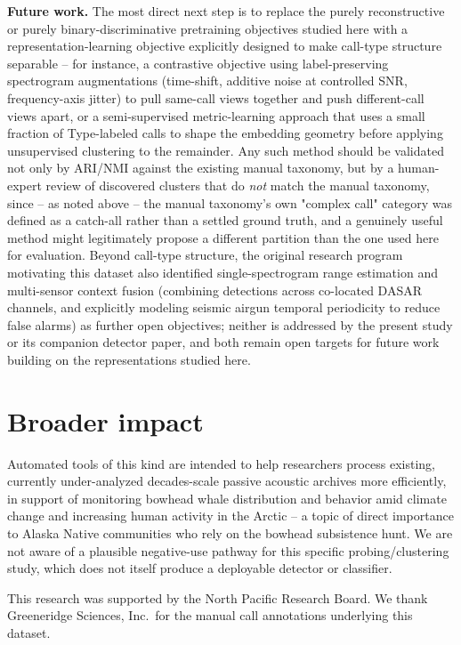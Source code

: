 \documentclass{article}
\begin{document}
\textbf{Future work.} The most direct next step is to replace the purely
reconstructive or purely binary-discriminative pretraining objectives
studied here with a representation-learning objective explicitly designed
to make call-type structure separable -- for instance, a contrastive
objective using label-preserving spectrogram augmentations (time-shift,
additive noise at controlled SNR, frequency-axis jitter) to pull same-call
views together and push different-call views apart, or a semi-supervised
metric-learning approach that uses a small fraction of Type-labeled calls
to shape the embedding geometry before applying unsupervised clustering to
the remainder. Any such method should be validated not only by
ARI/NMI against the existing manual taxonomy, but by a human-expert review
of discovered clusters that do \emph{not} match the manual taxonomy, since
-- as noted above -- the manual taxonomy's own "complex call" category was
defined as a catch-all rather than a settled ground truth, and a genuinely
useful method might legitimately propose a different partition than the
one used here for evaluation. Beyond call-type structure, the original
research program motivating this dataset also identified single-spectrogram
range estimation and multi-sensor context fusion (combining detections
across co-located DASAR channels, and explicitly modeling seismic airgun
temporal periodicity to reduce false alarms) as further open objectives;
neither is addressed by the present study or its companion detector paper,
and both remain open targets for future work building on the
representations studied here.

\section*{Broader impact}
Automated tools of this kind are intended to help researchers process
existing, currently under-analyzed decades-scale passive acoustic
archives more efficiently, in support of monitoring bowhead whale
distribution and behavior amid climate change and increasing human
activity in the Arctic -- a topic of direct importance to Alaska Native
communities who rely on the bowhead subsistence hunt. We are not aware of
a plausible negative-use pathway for this specific probing/clustering
study, which does not itself produce a deployable detector or classifier.

\begin{ack}
This research was supported by the North Pacific Research Board. We thank
Greeneridge Sciences, Inc.\ for the manual call annotations underlying
this dataset.
\end{ack}
\end{document}

